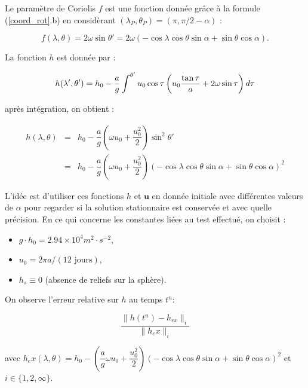 Le paramètre de Coriolis $f$ est une fonction donnée grâce à la formule (\ref{coord_rot}.b) en considèrant $(\lambda_P, \theta_P) = (\pi, \pi/2 - \alpha)$ :

\begin{equation}
f (\lambda, \theta) = 2 \omega \sin \theta' = 2 \omega \left( - \cos \lambda \cos \theta \sin \alpha + \sin \theta \cos \alpha \right).
\end{equation}

La fonction $h$ est donnée par :

\begin{equation}
h(\lambda', \theta') = h_0 - \dfrac{a}{g} \displaystyle\int^{\theta'} u_0 \cos \tau \left( u_0 \dfrac{\tan \tau}{a} + 2 \omega \sin \tau \right) d \tau
\end{equation}

après intégration, on obtient :

\begin{equation}
\begin{array}{rcl}
h(\lambda, \theta) & = & h_0 - \dfrac{a}{g} \left( \omega u_0 + \dfrac{u_0^2}{2} \right) \sin^2 \theta' \\
                   & = & h_0 - \dfrac{a}{g} \left( \omega u_0 + \dfrac{u_0^2}{2} \right) \left( - \cos \lambda \cos \theta \sin \alpha + \sin \theta \cos \alpha \right)^2
\end{array}
\label{eq: williamson 2 initial height}
\end{equation}

L'idée est d'utiliser ces fonctions $h$ et $\mathbf{u}$ en donnée initiale avec différentes valeurs de $\alpha$ pour regarder si la solution stationnaire est conservée et avec quelle précision. En ce qui concerne les constantes liées au test effectué, on choisit :
\begin{itemize}
\item $g \cdot h_0= 2.94 \times 10^4 m^2 \cdot s^{-2}$,
\item $u_0= 2 \pi a / (12 \text{ jours})$,
\item $h_s \equiv 0$ (absence de reliefs sur la sphère).
\end{itemize}

On observe l'erreur relative sur $h$ au temps $t^n$:

\begin{equation}
\dfrac{\| h(t^n) - h_{ex}\|_i}{\| h_ex \|_i}
\end{equation}

avec $h_ex(\lambda, \theta) = h_0 - \left( \dfrac{a}{g} \omega u_0 + \dfrac{u_0^2}{2} \right) \left( - \cos \lambda \cos \theta \sin \alpha + \sin \theta \cos \alpha \right)^2$ et $i \in \lbrace 1,2,\infty \rbrace$.


